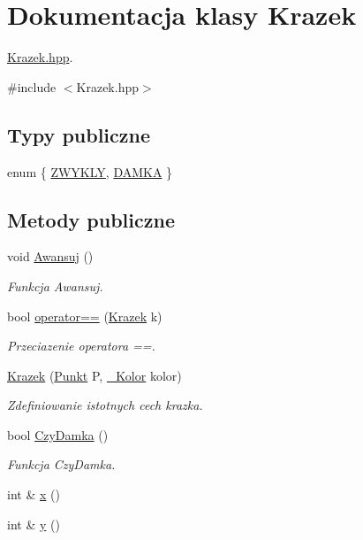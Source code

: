 \hypertarget{class_krazek}{\section{Dokumentacja klasy Krazek}
\label{class_krazek}
}


\hyperlink{_krazek_8hpp}{Krazek.\-hpp}.  




{\ttfamily \#include $<$Krazek.\-hpp$>$}

\subsection*{Typy publiczne}
\begin{DoxyCompactItemize}
\item 
enum \{ \hyperlink{class_krazek_a079112dabc156870b9f659aaf5a64191a874cd211d4bb55eb3d167abf13d36f22}{Z\-W\-Y\-K\-L\-Y}, 
\hyperlink{class_krazek_a079112dabc156870b9f659aaf5a64191a00b8d47a0e1efc6faf59b4d14933d9da}{D\-A\-M\-K\-A}
 \}
\end{DoxyCompactItemize}
\subsection*{Metody publiczne}
\begin{DoxyCompactItemize}
\item 
void \hyperlink{class_krazek_a55a19bb727d0ed47f672318107fcf6ba}{Awansuj} ()
\begin{DoxyCompactList}\small\item\em Funkcja Awansuj. \end{DoxyCompactList}\item 
bool \hyperlink{class_krazek_a83dfee22f9cee979b3406fa855bbb0a8}{operator==} (\hyperlink{class_krazek}{Krazek} k)
\begin{DoxyCompactList}\small\item\em Przeciazenie operatora ==. \end{DoxyCompactList}\item 
\hyperlink{class_krazek_a9efc0cb14e2e572d5a7b7aaabbf7a365}{Krazek} (\hyperlink{class_punkt}{Punkt} P, \hyperlink{_punkt_8hpp_af66113a5c012c322e61ec5429f53c13c}{\-\_\-\-Kolor} kolor)
\begin{DoxyCompactList}\small\item\em Zdefiniowanie istotnych cech krazka. \end{DoxyCompactList}\item 
bool \hyperlink{class_krazek_a79aec7e8975a3fc7cb072bba6a7c58c7}{Czy\-Damka} ()
\begin{DoxyCompactList}\small\item\em Funkcja Czy\-Damka. \end{DoxyCompactList}\item 
int \& \hyperlink{class_krazek_a22e30142c237207d7c36c711d00e54b9}{x} ()
\item 
int \& \hyperlink{class_krazek_a86e8300a948db8a9d9f94e69858cb4bf}{y} ()
\end{DoxyCompactItemize}
